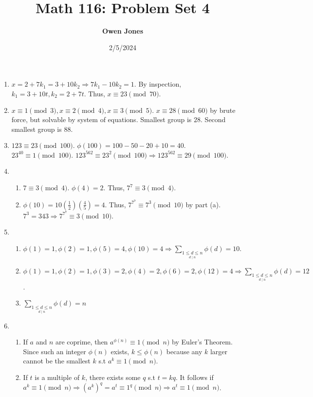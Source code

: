 \documentclass[10pt]{article}
\title{\bf Math 116: Problem Set 4}
\date{2/5/2024}
\author{\bf Owen Jones}
\begin{document}
\maketitle
\begin{enumerate}[label= \arabic*.]
    \item $x=2+7k_1=3+10k_2\Rightarrow 7k_1-10k_2=1$. 
    By inspection, $k_1=3+10t,k_2=2+7t$. 
    Thus, $x\equiv 23\pmod{70}$.
    \item $x\equiv 1\pmod{3},x\equiv 2\pmod{4},x\equiv 3\pmod{5}$.
    $x\equiv 28\pmod{60}$ by brute force, but solvable by system of equations. 
    Smallest group is $28$. Second smallest group is $88$.
    \item $123\equiv 23\pmod{100}$. 
    $\phi(100)=100-50-20+10=40$. $23^{40}\equiv 1\pmod{100}$. 
    $123^{562}\equiv 23^2\pmod{100}\Rightarrow 123^{562}\equiv 29\pmod{100}$.
    \item \begin{enumerate}
        \item $7\equiv 3\pmod{4}$. $\phi(4)=2$. Thus, $7^7\equiv 3\pmod{4}$.
        \item $\phi(10)=10(\frac{1}{2})(\frac{4}{5})=4$. 
        Thus, $7^{7^7}\equiv 7^3\pmod{10}$ by part (a).
        $7^3=343\Rightarrow 7^{7^7}\equiv 3\pmod{10}$.
    \end{enumerate}
    \item \begin{enumerate}
        \item $\phi(1)=1,\phi(2)=1,\phi(5)=4,\phi(10)=4\Rightarrow\displaystyle\sum_{\underset{d\mid n}{1\le d\le n}} \phi(d)=10$.
        \item $\phi(1)=1,\phi(2)=1,\phi(3)=2,\phi(4)=2,\phi(6)=2,\phi(12)=4\Rightarrow\displaystyle\sum_{\underset{d\mid n}{1\le d\le n}} \phi(d)=12$.
        \item $\displaystyle\sum_{\underset{d\mid n}{1\le d\le n}} \phi(d)=n$
    \end{enumerate}
    \item \begin{enumerate}
        \item If $a$ and $n$ are coprime, then $a^{\phi(n)}\equiv 1\pmod{n}$ by Euler's Theorem. 
        Since such an integer $\phi(n)$ exists, $k\le \phi(n)$ because any $k$ larger cannot be the smallest $k$ s.t $a^k\equiv1\pmod{n}$.
        \item If $t$ is a multiple of $k$, there exists some $q$ s.t $t=kq$. 
        It follows if $a^k\equiv 1\pmod{n}\Rightarrow {(a^k)}^q=a^t\equiv 1^q\pmod{n}\Rightarrow a^t\equiv 1\pmod{n}$.

\end{enumerate}
\end{enumerate}
\end{document}
